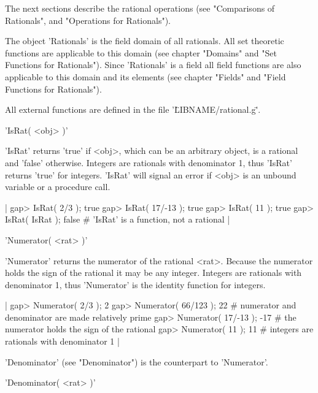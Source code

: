 The next sections describe  the rational operations (see "Comparisons  of
Rationals", and "Operations for Rationals").

The {\GAP} object 'Rationals' is the field domain  of all rationals.  All
set  theoretic  functions  are applicable  to  this  domain (see  chapter
"Domains"  and "Set  Functions for  Rationals").  Since 'Rationals' is  a
field all  field  functions are also  applicable  to this domain  and its
elements (see chapter "Fields" and "Field Functions for Rationals").

All external functions are defined in the file '\"LIBNAME/rational.g\"'.

%

'IsRat( <obj> )'

'IsRat' returns 'true' if <obj>,  which can be  an arbitrary object, is a
rational and 'false' otherwise.   Integers are rationals with denominator
1,   thus 'IsRat' returns  'true' for  integers.   'IsRat' will signal an
error if <obj> is an unbound variable or a procedure call.

|    gap> IsRat( 2/3 );
    true
    gap> IsRat( 17/-13 );
    true
    gap> IsRat( 11 );
    true
    gap> IsRat( IsRat );
    false    # 'IsRat' is a function, not a rational |

%

'Numerator( <rat> )'

'Numerator'  returns  the numerator of the rational <rat>.   Because  the
numerator holds the sign of the rational it may be any integer.  Integers
are rationals  with  denominator  1, thus  'Numerator'  is  the  identity
function for integers.

|    gap> Numerator( 2/3 );
    2
    gap> Numerator( 66/123 );
    22    # numerator and denominator are made relatively prime
    gap> Numerator( 17/-13 );
    -17    # the numerator holds the sign of the rational
    gap> Numerator( 11 );
    11    # integers are rationals with denominator 1 |

'Denominator' (see "Denominator") is the counterpart to 'Numerator'.

%

'Denominator( <rat> )'

